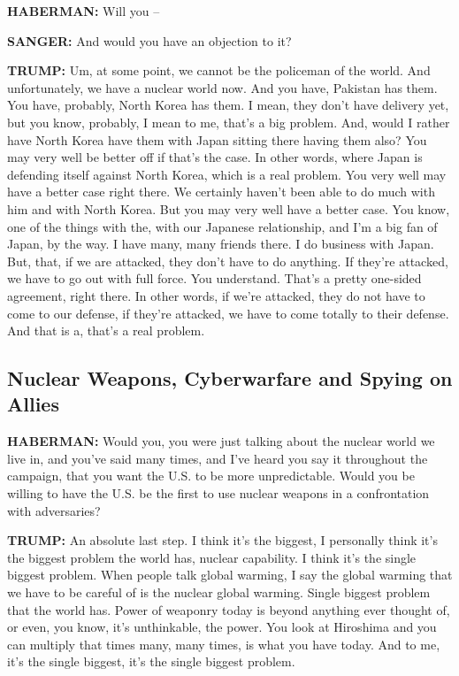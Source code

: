 \textbf{HABERMAN:} Will you --

\textbf{SANGER:} And would you have an objection to it?

\textbf{TRUMP:} Um, at some point, we cannot be the policeman of the
world. And unfortunately, we have a nuclear world now. And you have,
Pakistan has them. You have, probably, North Korea has them. I mean,
they don't have delivery yet, but you know, probably, I mean to me,
that's a big problem. And, would I rather have North Korea have them
with Japan sitting there having them also? You may very well be better
off if that's the case. In other words, where Japan is defending itself
against North Korea, which is a real problem. You very well may have a
better case right there. We certainly haven't been able to do much with
him and with North Korea. But you may very well have a better case. You
know, one of the things with the, with our Japanese relationship, and
I'm a big fan of Japan, by the way. I have many, many friends there. I
do business with Japan. But, that, if we are attacked, they don't have
to do anything. If they're attacked, we have to go out with full force.
You understand. That's a pretty one-sided agreement, right there. In
other words, if we're attacked, they do not have to come to our defense,
if they're attacked, we have to come totally to their defense. And that
is a, that's a real problem.

\hypertarget{nuclear-weapons-cyberwarfare-and-spying-on-allies}{%
\subsection{Nuclear Weapons, Cyberwarfare and Spying on
Allies}\label{nuclear-weapons-cyberwarfare-and-spying-on-allies}}

\textbf{HABERMAN:} Would you, you were just talking about the nuclear
world we live in, and you've said many times, and I've heard you say it
throughout the campaign, that you want the U.S. to be more
unpredictable. Would you be willing to have the U.S. be the first to use
nuclear weapons in a confrontation with adversaries?

\textbf{TRUMP:} An absolute last step. I think it's the biggest, I
personally think it's the biggest problem the world has, nuclear
capability. I think it's the single biggest problem. When people talk
global warming, I say the global warming that we have to be careful of
is the nuclear global warming. Single biggest problem that the world
has. Power of weaponry today is beyond anything ever thought of, or
even, you know, it's unthinkable, the power. You look at Hiroshima and
you can multiply that times many, many times, is what you have today.
And to me, it's the single biggest, it's the single biggest problem.

